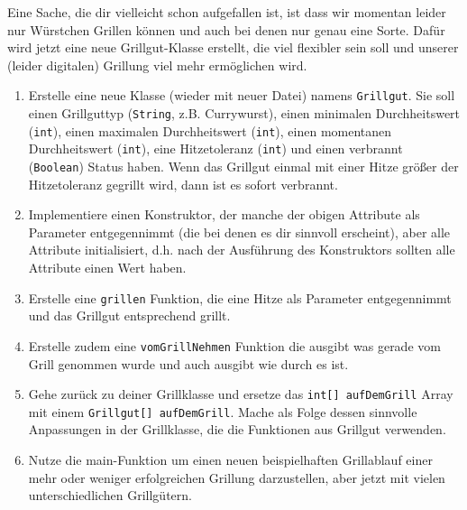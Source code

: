 \documentclass{../../sheet}
\begin{document}
\newpage
{}
Eine Sache, die dir vielleicht schon aufgefallen ist, ist dass wir momentan leider nur Würstchen Grillen können und auch bei denen nur genau eine Sorte. Dafür wird jetzt eine neue Grillgut-Klasse erstellt, die viel flexibler sein soll und unserer (leider digitalen) Grillung viel mehr ermöglichen wird.
\begin{enumerate}
    \item Erstelle eine neue Klasse (wieder mit neuer Datei) namens \texttt{Grillgut}. Sie soll einen Grillguttyp (\texttt{String}, z.B. Currywurst), einen minimalen Durchheitswert (\texttt{int}), einen maximalen Durchheitswert (\texttt{int}), einen momentanen Durchheitswert (\texttt{int}), eine Hitzetoleranz (\texttt{int}) und einen verbrannt (\texttt{Boolean}) Status haben. Wenn das Grillgut einmal mit einer Hitze größer der Hitzetoleranz gegrillt wird, dann ist es sofort verbrannt.
    \item Implementiere einen Konstruktor, der manche der obigen Attribute als Parameter entgegennimmt (die bei denen es dir sinnvoll erscheint), aber alle Attribute initialisiert, d.h. nach der Ausführung des Konstruktors sollten alle Attribute einen Wert haben.
    \item Erstelle eine \texttt{grillen} Funktion, die eine Hitze als Parameter entgegennimmt und das Grillgut entsprechend grillt.
    \item Erstelle zudem eine \texttt{vomGrillNehmen} Funktion die ausgibt was gerade vom Grill genommen wurde und auch ausgibt wie durch es ist.
    \item Gehe zurück zu deiner Grillklasse und ersetze das \texttt{int[] aufDemGrill} Array mit einem \texttt{Grillgut[] aufDemGrill}. Mache als Folge dessen sinnvolle Anpassungen in der Grillklasse, die die Funktionen aus Grillgut verwenden.
    \item Nutze die main-Funktion um einen neuen beispielhaften Grillablauf einer mehr oder weniger erfolgreichen
    Grillung darzustellen, aber jetzt mit vielen unterschiedlichen Grillgütern.
\end{enumerate}
\end{document}

